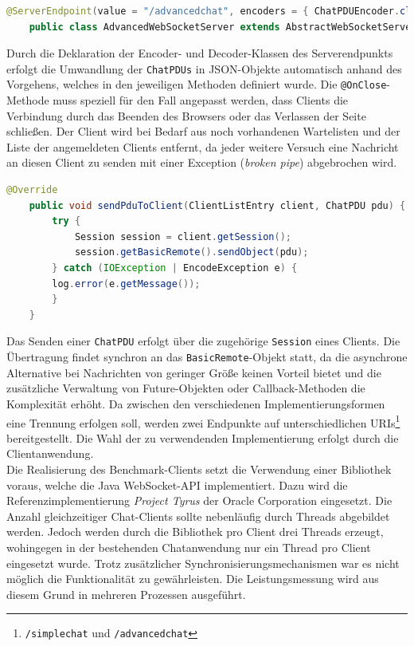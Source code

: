 \documentclass[11pt,a4paper,titlepage]{scrartcl}
\numberwithin{equation}{section}
\begin{document}
\begin{lstlisting}[frame=single, language=Java, caption=AdvancedWebSocketServer Annotation,label=lst:wsServerImpl]
	@ServerEndpoint(value = "/advancedchat", encoders = { ChatPDUEncoder.class }, decoders = { ChatPDUDecoder.class })
	public class AdvancedWebSocketServer extends AbstractWebSocketServer { ... }
\end{lstlisting}

\noindent Durch die Deklaration der Encoder- und Decoder-Klassen des Serverendpunkts erfolgt die Umwandlung der \texttt{ChatPDUs} in JSON-Objekte automatisch anhand des Vorgehens, welches in den jeweiligen Methoden definiert wurde. Die \texttt{@OnClose}-Methode muss speziell für den Fall angepasst werden, dass Clients die Verbindung durch das Beenden des Browsers oder das Verlassen der Seite schließen. Der Client wird bei Bedarf aus noch vorhandenen Wartelisten und der Liste der angemeldeten Clients entfernt, da jeder weitere Versuch eine Nachricht an diesen Client zu senden mit einer Exception (\textit{broken pipe}) abgebrochen wird.\medskip

\begin{lstlisting}[frame=single, language=Java, caption=Senden einer ChatPDU label=lst:wsServerPDU]
	@Override
	public void sendPduToClient(ClientListEntry client, ChatPDU pdu) {
		try {
			Session session = client.getSession();
			session.getBasicRemote().sendObject(pdu);
		} catch (IOException | EncodeException e) {
		log.error(e.getMessage());
		}
	}
\end{lstlisting}

\noindent Das Senden einer \texttt{ChatPDU} erfolgt über die zugehörige \texttt{Session} eines Clients. Die Übertragung findet synchron an das \texttt{BasicRemote}-Objekt statt, da die asynchrone Alternative bei Nachrichten von geringer Größe keinen Vorteil bietet und die zusätzliche Verwaltung von Future-Objekten oder Callback-Methoden die Komplexität erhöht. Da zwischen den verschiedenen Implementierungsformen eine Trennung erfolgen soll, werden zwei Endpunkte auf unterschiedlichen URIs\footnote{\texttt{/simplechat} und \texttt{/advancedchat}} bereitgestellt. Die Wahl der zu verwendenden Implementierung erfolgt durch die Clientanwendung. \\

\noindent Die Realisierung des Benchmark-Clients setzt die Verwendung einer Bibliothek voraus, welche die Java WebSocket-API implementiert. Dazu wird die Referenzimplementierung \textit{Project Tyrus} der Oracle Corporation eingesetzt. Die Anzahl gleichzeitiger Chat-Clients sollte nebenläufig durch Threads abgebildet werden. Jedoch werden durch die Bibliothek pro Client drei Threads erzeugt, wohingegen in der bestehenden Chatanwendung nur ein Thread pro Client eingesetzt wurde. Trotz zusätzlicher Synchronisierungsmechanismen war es nicht möglich die Funktionalität zu gewährleisten. Die Leistungsmessung wird aus diesem Grund in mehreren Prozessen ausgeführt.\\
\end{document}
